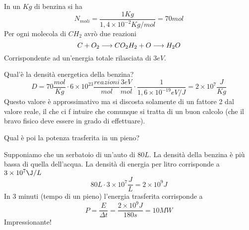 In un $Kg$ di benzina si ha
\[
N_{moli} =\frac{1Kg}{1,4\times 10^{-2}Kg/mol}=70mol
\]
Per ogni molecola di $CH_2$ avrò due reazioni
\[
C+O_2\longrightarrow CO_2\\
H_2+O\longrightarrow H_2O
\]
Corrispondente ad un'energia totale rilasciata di $3eV$.

Qual'è la densità energetica della benzina?
\[
D=70\frac{mol}{Kg}\cdot 6\times 10^{23}\frac{reazioni}{mol}\frac{3eV}{mol}\cdot \frac{1}{1,6\times 10^{-19}eV/J}=2\times 10^7\frac{J}{Kg}
\]
Questo valore è approssimativo ma si discosta solamente di un fattore 2 dal valore reale, il che ci f intuire che comunque si tratta di un buon calcolo (che il bravo fisico deve essere in grado di effettuare).

Qual è poi la potenza trasferita in un pieno?

Supponiamo che un serbatoio di un'auto di $80L$. La densità della benzina è più bassa di quella dell'acqua. 
La densità di energia per litro corrisponde a $3\times10^7\J/L$
\[
80L\cdot 3\times10^7\frac{J}{L}=2\times10^9J
\]
In 3 minuti (tempo di un pieno) l'energia trasferita corrisponde a 
\[
P=\frac{E}{\Delta t}=\frac{2\times10^9J}{180s}=10MW
\]
Impressionante!

